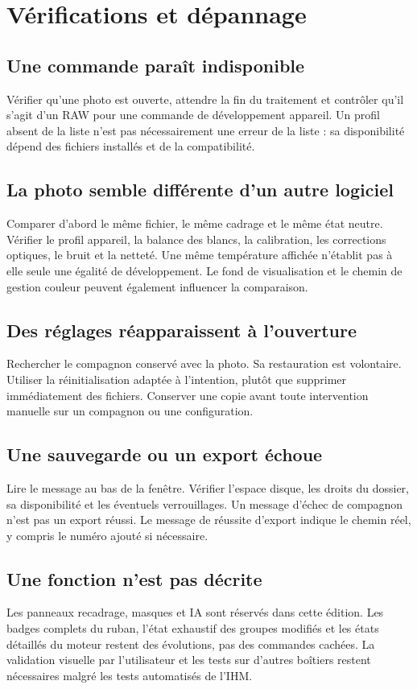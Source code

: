 \chapter{Vérifications et dépannage}
\section{Une commande paraît indisponible}
Vérifier qu’une photo est ouverte, attendre la fin du traitement et contrôler
qu’il s’agit d’un RAW pour une commande de développement appareil. Un profil
absent de la liste n’est pas nécessairement une erreur de la liste : sa
disponibilité dépend des fichiers installés et de la compatibilité.

\section{La photo semble différente d’un autre logiciel}
Comparer d’abord le même fichier, le même cadrage et le même état neutre.
Vérifier le profil appareil, la balance des blancs, la calibration, les corrections
optiques, le bruit et la netteté. Une même température affichée n’établit pas
à elle seule une égalité de développement. Le fond de visualisation et le
chemin de gestion couleur peuvent également influencer la comparaison.

\section{Des réglages réapparaissent à l’ouverture}
Rechercher le compagnon  conservé avec la photo. Sa restauration
est volontaire. Utiliser la réinitialisation adaptée à l’intention, plutôt
que supprimer immédiatement des fichiers. Conserver une copie avant toute
intervention manuelle sur un compagnon ou une configuration.

\section{Une sauvegarde ou un export échoue}
Lire le message au bas de la fenêtre. Vérifier l’espace disque, les droits
du dossier, sa disponibilité et les éventuels verrouillages. Un message
d’échec de compagnon n’est pas un export réussi. Le message de réussite
d’export indique le chemin réel, y compris le numéro ajouté si nécessaire.

\section{Une fonction n’est pas décrite}
Les panneaux recadrage, masques et IA sont réservés dans cette édition.
Les badges complets du ruban, l’état exhaustif des groupes modifiés et les
états détaillés du moteur restent des évolutions, pas des commandes cachées.
La validation visuelle par l’utilisateur et les tests sur d’autres boîtiers
restent nécessaires malgré les tests automatisés de l’IHM.
